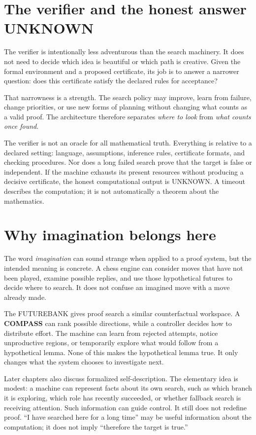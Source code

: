 \documentclass[11pt,openany]{book}
\theoremstyle{definition}
\theoremstyle{remark}
\begin{document}
\section*{The verifier and the honest answer UNKNOWN}
The verifier is intentionally less adventurous than the search machinery. It does not need to decide which idea is beautiful or which path is creative. Given the formal environment and a proposed certificate, its job is to answer a narrower question: does this certificate satisfy the declared rules for acceptance?

That narrowness is a strength. The search policy may improve, learn from failure, change priorities, or use new forms of planning without changing what counts as a valid proof. The architecture therefore separates \emph{where to look} from \emph{what counts once found}.

The verifier is not an oracle for all mathematical truth. Everything is relative to a declared setting: language, assumptions, inference rules, certificate formats, and checking procedures. Nor does a long failed search prove that the target is false or independent. If the machine exhausts its present resources without producing a decisive certificate, the honest computational output is \textsf{UNKNOWN}. A timeout describes the computation; it is not automatically a theorem about the mathematics.

\section*{Why imagination belongs here}
The word \emph{imagination} can sound strange when applied to a proof system, but the intended meaning is concrete. A chess engine can consider moves that have not been played, examine possible replies, and use those hypothetical futures to decide where to search. It does not confuse an imagined move with a move already made.

The FUTUREBANK gives proof search a similar counterfactual workspace. A \textbf{COMPASS} can rank possible directions, while a controller decides how to distribute effort. The machine can learn from rejected attempts, notice unproductive regions, or temporarily explore what would follow from a hypothetical lemma. None of this makes the hypothetical lemma true. It only changes what the system chooses to investigate next.

Later chapters also discuss formalized self-description. The elementary idea is modest: a machine can represent facts about its own search, such as which branch it is exploring, which role has recently succeeded, or whether fallback search is receiving attention. Such information can guide control. It still does not redefine proof. ``I have searched here for a long time'' may be useful information about the computation; it does not imply ``therefore the target is true.''
\end{document}
